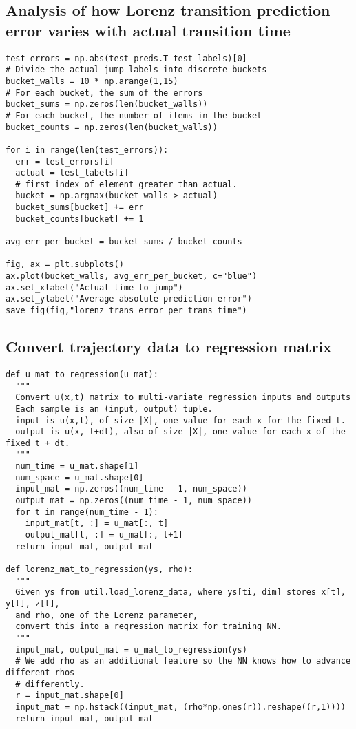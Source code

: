 \documentclass[letterpaper, 10 pt, conference]{ieeeconf}  %
\begin{document}
\subsection*{Analysis of how Lorenz transition prediction error varies with actual transition time}
\begin{verbatim}
test_errors = np.abs(test_preds.T-test_labels)[0]
# Divide the actual jump labels into discrete buckets
bucket_walls = 10 * np.arange(1,15)
# For each bucket, the sum of the errors
bucket_sums = np.zeros(len(bucket_walls))
# For each bucket, the number of items in the bucket
bucket_counts = np.zeros(len(bucket_walls))

for i in range(len(test_errors)):
  err = test_errors[i]
  actual = test_labels[i]
  # first index of element greater than actual.
  bucket = np.argmax(bucket_walls > actual)
  bucket_sums[bucket] += err
  bucket_counts[bucket] += 1

avg_err_per_bucket = bucket_sums / bucket_counts

fig, ax = plt.subplots()
ax.plot(bucket_walls, avg_err_per_bucket, c="blue")
ax.set_xlabel("Actual time to jump")
ax.set_ylabel("Average absolute prediction error")
save_fig(fig,"lorenz_trans_error_per_trans_time")
\end{verbatim}
\subsection*{Convert trajectory data to regression matrix}
\begin{verbatim}
def u_mat_to_regression(u_mat):
  """
  Convert u(x,t) matrix to multi-variate regression inputs and outputs
  Each sample is an (input, output) tuple.
  input is u(x,t), of size |X|, one value for each x for the fixed t.
  output is u(x, t+dt), also of size |X|, one value for each x of the fixed t + dt.
  """
  num_time = u_mat.shape[1]
  num_space = u_mat.shape[0]
  input_mat = np.zeros((num_time - 1, num_space))
  output_mat = np.zeros((num_time - 1, num_space))
  for t in range(num_time - 1):
    input_mat[t, :] = u_mat[:, t]
    output_mat[t, :] = u_mat[:, t+1]
  return input_mat, output_mat

def lorenz_mat_to_regression(ys, rho):
  """
  Given ys from util.load_lorenz_data, where ys[ti, dim] stores x[t], y[t], z[t],
  and rho, one of the Lorenz parameter,
  convert this into a regression matrix for training NN.
  """
  input_mat, output_mat = u_mat_to_regression(ys)
  # We add rho as an additional feature so the NN knows how to advance different rhos
  # differently.
  r = input_mat.shape[0]
  input_mat = np.hstack((input_mat, (rho*np.ones(r)).reshape((r,1))))
  return input_mat, output_mat
\end{verbatim}
\end{document}
